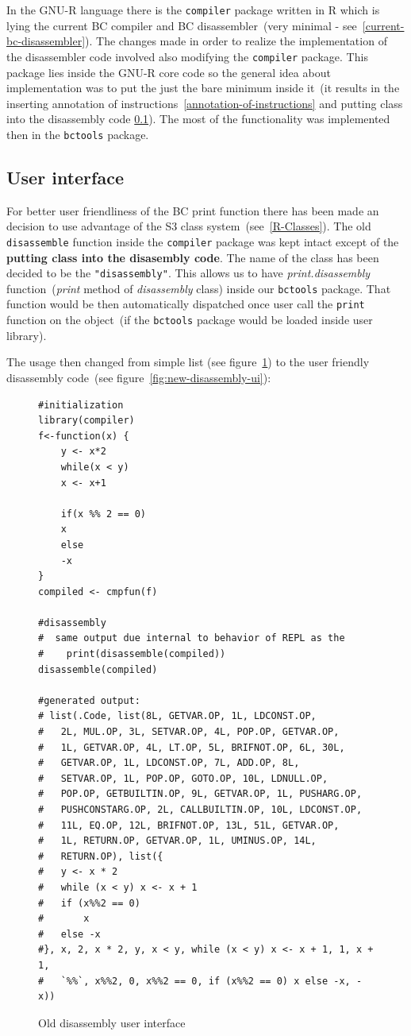 \documentclass[thesis=M,english]{FITthesis}[2018/10/20]
\newcommand{\code}[1]{\texttt{#1}}
\begin{document}
In the GNU-R language there is the \code{compiler} package written in R which is lying the current BC compiler and BC disassembler~(very minimal - see~\ref{current-bc-disassembler}). The changes made in order to realize the implementation of the disassembler code involved also modifying the \code{compiler} package. This package lies inside the GNU-R core code so the general idea about implementation was to put the just the bare minimum inside it~(it results in the inserting annotation of instructions~\ref{annotation-of-instructions} and putting class into the disassembly code \ref{user-interface}). The most of the functionality was implemented then in the \code{bctools} package.

\subsection{User interface}\label{user-interface}

For better user friendliness of the BC print function there has been made an decision to use advantage of the S3 class system~(see~\ref{R-Classes}). The old \code{disassemble} function inside the \code{compiler} package was kept intact except of the \textbf{putting class into the disasembly code}. The name of the class has been decided to be the \code{"disassembly"}. This allows us to have \textit{print.disassembly} function~(\textit{print} method of \textit{disassembly} class) inside our \code{bctools} package. That function would be then automatically dispatched once user call the \code{print} function on the object~(if the \code{bctools} package would be loaded inside user library).

The usage then changed from simple list (see figure~\ref{fig:old-disassembly-ui}) to the user friendly disassembly code~(see figure~\ref{fig:new-disassembly-ui}):

\begin{figure}[!h]
\begin{lstlisting}
#initialization
library(compiler)
f<-function(x) {
    y <- x*2
    while(x < y)
	x <- x+1

    if(x %% 2 == 0)
	x
    else
	-x
}
compiled <- cmpfun(f)

#disassembly
#  same output due internal to behavior of REPL as the
#    print(disassemble(compiled))
disassemble(compiled)

#generated output:
# list(.Code, list(8L, GETVAR.OP, 1L, LDCONST.OP, 
#	2L, MUL.OP, 3L, SETVAR.OP, 4L, POP.OP, GETVAR.OP,
#	1L, GETVAR.OP, 4L, LT.OP, 5L, BRIFNOT.OP, 6L, 30L, 
#	GETVAR.OP, 1L, LDCONST.OP, 7L, ADD.OP, 8L, 
#	SETVAR.OP, 1L, POP.OP, GOTO.OP, 10L, LDNULL.OP, 
#	POP.OP, GETBUILTIN.OP, 9L, GETVAR.OP, 1L, PUSHARG.OP,
#	PUSHCONSTARG.OP, 2L, CALLBUILTIN.OP, 10L, LDCONST.OP, 
#	11L, EQ.OP, 12L, BRIFNOT.OP, 13L, 51L, GETVAR.OP, 
#	1L, RETURN.OP, GETVAR.OP, 1L, UMINUS.OP, 14L, 
#	RETURN.OP), list({
#   y <- x * 2
#   while (x < y) x <- x + 1
#   if (x%%2 == 0) 
#       x
#   else -x
#}, x, 2, x * 2, y, x < y, while (x < y) x <- x + 1, 1, x + 1, 
#   `%%`, x%%2, 0, x%%2 == 0, if (x%%2 == 0) x else -x, -x))
\end{lstlisting}
	\caption{Old disassembly user interface}\label{fig:old-disassembly-ui}
\end{figure}
\end{document}
